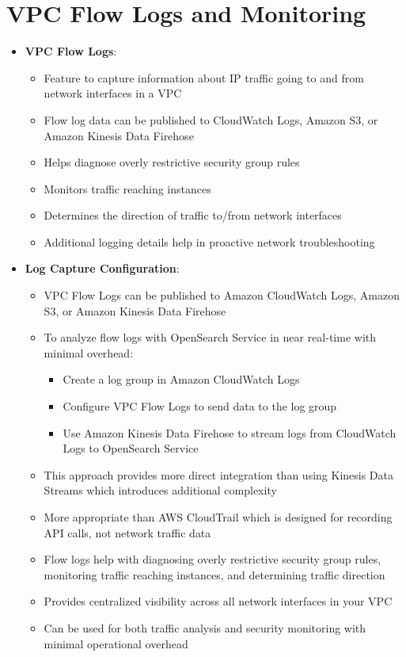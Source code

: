 \documentclass[11pt,a4paper]{report}
\begin{document}
\section{VPC Flow Logs and Monitoring}

\begin{itemize}
  \item \textbf{VPC Flow Logs}:
\begin{itemize}
  \item Feature to capture information about IP traffic going to and from network interfaces in a VPC
  \item Flow log data can be published to CloudWatch Logs, Amazon S3, or Amazon Kinesis Data Firehose
  \item Helps diagnose overly restrictive security group rules
  \item Monitors traffic reaching instances
  \item Determines the direction of traffic to/from network interfaces
  \item Additional logging details help in proactive network troubleshooting
\end{itemize}
  \item \textbf{Log Capture Configuration}:
\begin{itemize}
  \item VPC Flow Logs can be published to Amazon CloudWatch Logs, Amazon S3, or Amazon Kinesis Data Firehose
  \item To analyze flow logs with OpenSearch Service in near real-time with minimal overhead:
\begin{itemize}
  \item Create a log group in Amazon CloudWatch Logs
  \item Configure VPC Flow Logs to send data to the log group
  \item Use Amazon Kinesis Data Firehose to stream logs from CloudWatch Logs to OpenSearch Service
\end{itemize}
  \item This approach provides more direct integration than using Kinesis Data Streams which introduces additional complexity
  \item More appropriate than AWS CloudTrail which is designed for recording API calls, not network traffic data
  \item Flow logs help with diagnosing overly restrictive security group rules, monitoring traffic reaching instances, and determining traffic direction
  \item Provides centralized visibility across all network interfaces in your VPC
  \item Can be used for both traffic analysis and security monitoring with minimal operational overhead
\end{itemize}
\end{itemize}
\end{document}
